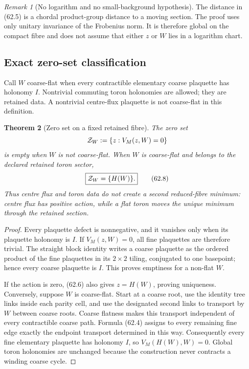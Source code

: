 \documentclass[11pt,oneside]{book}
\newtheorem{theorem}{Theorem}[chapter]
\theoremstyle{definition}
\theoremstyle{remark}
\newtheorem{remark}[theorem]{Remark}
\begin{document}
\begin{remark}[No logarithm and no small-background hypothesis]
\label{rem:e8v62-no-chart}
The distance in (62.5) is a chordal product-group distance to a
moving section.  The proof uses only unitary invariance of the
Frobenius norm.  It is therefore global on the compact fibre and
does not assume that either \(z\) or \(W\) lies in a logarithm
chart.
\end{remark}

\subsection{Exact zero-set classification}

Call \(W\) coarse-flat when every contractible elementary coarse
plaquette has holonomy \(I\).  Nontrivial commuting toron
holonomies are allowed; they are retained data.  A nontrivial
centre-flux plaquette is not coarse-flat in this definition.

\begin{theorem}[Zero set on a fixed retained fibre]
\label{thm:e8v62-zero-set}
The zero set
\[
 {\cal Z}_W:=\{z:V_M(z,W)=0\}
\]
is empty when \(W\) is not coarse-flat.  When \(W\) is
coarse-flat and belongs to the declared retained toron sector,
\[
                         \boxed{{\cal Z}_W=\{H(W)\}.}         \tag{62.8}
\]
Thus centre flux and toron data do not create a second reduced-fibre
minimum: centre flux has positive action, while a flat toron moves
the unique minimum through the retained section.
\end{theorem}

\begin{proof}
Every plaquette defect is nonnegative, and it vanishes only when its
plaquette holonomy is \(I\).  If \(V_M(z,W)=0\), all fine
plaquettes are therefore trivial.  The straight block identity
writes a coarse plaquette as the ordered product of the fine
plaquettes in its \(2\times2\) tiling, conjugated to one basepoint;
hence every coarse plaquette is \(I\).  This proves emptiness for a
non-flat \(W\).

If the action is zero, (62.6) also gives \(z=H(W)\), proving
uniqueness.  Conversely, suppose \(W\) is coarse-flat.  Start at a
coarse root, use the identity tree links inside each parity cell,
and use the designated second links to transport by \(W\) between
coarse roots.  Coarse flatness makes this transport independent of
every contractible coarse path.  Formula (62.4) assigns to every
remaining fine edge exactly the endpoint transport determined in
this way.  Consequently every fine elementary plaquette has
holonomy \(I\), so \(V_M(H(W),W)=0\).  Global toron holonomies are
unchanged because the construction never contracts a winding coarse
cycle.
\end{proof}
\end{document}
